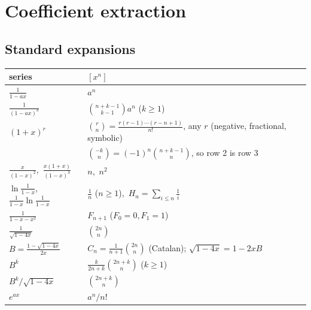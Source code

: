 \section{Coefficient extraction}
	\subsection{Standard expansions}
	\begin{center}\small\renewcommand{\arraystretch}{1.3}
	\begin{tabular}{@{}l@{\ \ }L{5.25cm}@{}}
	series & $[x^n]$ \\ \hline
	$\frac1{1-ax}$ & $a^n$ \\
	$\frac1{(1-ax)^k}$ & $\binom{n+k-1}{k-1}a^n$ \quad ($k\ge1$) \\
	$(1+x)^r$ & $\binom rn=\frac{r(r-1)\cdots(r-n+1)}{n!}$, any $r$ (negative, fractional, symbolic) \\
	& $\binom{-k}n=(-1)^n\binom{n+k-1}{n}$, so row 2 is row 3 \\
	$\frac{x}{(1-x)^2}$,\ $\frac{x(1+x)}{(1-x)^3}$ & $n$,\ $n^2$ \\
	$\ln\frac1{1-x}$,\ $\frac1{1-x}\ln\frac1{1-x}$ & $\frac1n$ ($n\ge1$),\ $H_n=\sum_{i\le n}\frac1i$ \\
	$\frac1{1-x-x^2}$ & $F_{n+1}$ ($F_0=0,F_1=1$) \\
	$\frac1{\sqrt{1-4x}}$ & $\binom{2n}n$ \\
	$B=\frac{1-\sqrt{1-4x}}{2x}$ & $C_n=\frac1{n+1}\binom{2n}n$ (Catalan); $\sqrt{1-4x}=1-2xB$ \\
	$B^k$ & $\frac{k}{2n+k}\binom{2n+k}n$ \quad ($k\ge1$) \\
	$B^k/\sqrt{1-4x}$ & $\binom{2n+k}n$ \\
	$e^{ax}$ & $a^n/n!$ \\
	\end{tabular}
	\end{center}

